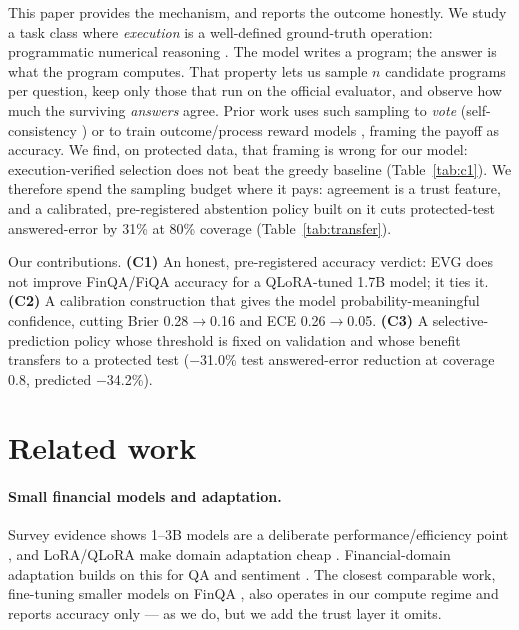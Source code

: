 \documentclass[10pt]{article}
\begin{document}
This paper provides the mechanism, and reports the outcome honestly. We study a task class
where \emph{execution} is a well-defined ground-truth operation: programmatic numerical
reasoning \citep{chen2021finqa}. The model writes a program; the answer is what the
program computes. That property lets us sample $n$ candidate programs per question, keep
only those that run on the official evaluator, and observe how much the surviving \emph{answers}
agree. Prior work uses such sampling to \emph{vote} (self-consistency \citep{wang2023selfconsistency})
or to train outcome/process reward models \citep{lightman2024verify,wang2024mathshepherd},
framing the payoff as accuracy. We find, on protected data, that framing is wrong for our
model: execution-verified selection does not beat the greedy baseline (Table~\ref{tab:c1}).
We therefore spend the sampling budget where it pays: agreement is a trust feature, and a
calibrated, pre-registered abstention policy built on it cuts protected-test answered-error
by 31\% at 80\% coverage (Table~\ref{tab:transfer}).

Our contributions. \textbf{(C1)} An honest, pre-registered accuracy verdict: EVG does not
improve FinQA/FiQA accuracy for a QLoRA-tuned 1.7B model; it ties it. \textbf{(C2)} A
calibration construction that gives the model probability-meaningful confidence, cutting
Brier 0.28$\rightarrow$0.16 and ECE 0.26$\rightarrow$0.05. \textbf{(C3)} A selective-prediction
policy whose threshold is fixed on validation and whose benefit transfers to a protected
test ($-$31.0\% test answered-error reduction at coverage 0.8, predicted $-$34.2\%).

\section{Related work}
\paragraph{Small financial models and adaptation.}
Survey evidence shows 1--3B models are a deliberate performance/efficiency point
\citep{subramanian2025slms,abdin2024phi3,zhang2024tinyllama}, and LoRA/QLoRA make domain
adaptation cheap \citep{hu2022lora,dettmers2023qlora}. Financial-domain adaptation builds
on this for QA and sentiment \citep{phogat2024finetuning,yang2023fingpt,yang2023investlm,wu2023bloomberg,huang2020finbert,shi2025kronos}.
The closest comparable work, fine-tuning smaller models on FinQA \citep{phogat2024finetuning},
also operates in our compute regime and reports accuracy only --- as we do, but we add the
trust layer it omits.
\end{document}
